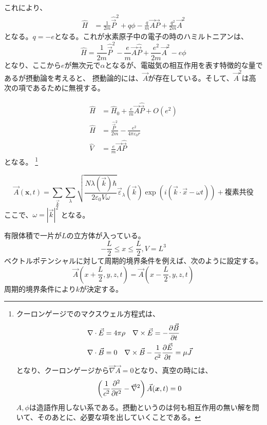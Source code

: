 \documentclass[titlepage]{ltjsarticle}
\begin{document}
これにより、
\begin{align}
  \hat{H} & = \frac{1}{2m} {\hat{\vec{P}}}^2 + q \phi - \frac{q}{m}\vec{A}\vec{P} + \frac{q^2}{2m}\vec{A}^2
\end{align}
となる。\(q=-e\)となる。これが水素原子中の電子の時のハミルトニアンは、
\begin{equation}
  \hat{H} = \frac{1}{2m} \hat{\vec{P}}^2 - \frac{e}{m} \vec{A} \hat{\vec{P}} + \frac{e^2}{2m} \vec{A}^2 - e \phi
\end{equation}
となり、ここから\(e\)が無次元で\(\alpha\)となるが、電磁気の相互作用を表す特徴的な量であるが摂動論を考えると、
摂動論的には、\(\vec{A}\)が存在している。そして、\(\vec{A}^2\)は高次の項であるために無視する。

\begin{align}
  \hat{H} & = \hat{H}_0 + \frac{e}{m}\vec{A}\hat{\vec{P}}+ O(e^2)\\
  \hat{H} & = \frac{\hat{\vec{P}}^2}{2m} - \frac{e^2}{4\pi \varepsilon_0 r}\\
  \hat{V} & = \frac{e}{m}\vec{A}\hat{\vec{P}}
\end{align}
となる。
\footnote{
  クーロンゲージでのマクスウェル方程式は、
  \begin{align}
    \nabla \cdot \vec{E} & = 4\pi \rho \quad \nabla \times \vec{E} = -\pdv{\vec{B}}{t}\\
    \nabla \cdot \vec{B} & = 0 \quad \nabla \times \vec{B} -\frac{1}{c^2} \pdv{\vec{E}}{t} = \mu \vec{J}
  \end{align}
  となり、クーロンゲージから\(\vec{\nabla}\vec{A} = 0\)となり、真空の時には、
  \begin{equation}
    \left( \frac{1}{c^2} \pdv[order=2]{}{t} - \vec{\nabla}^2 \right)\vec{A}(\bm{x},t) = 0
  \end{equation}
  \(A,\phi\)は造語作用しない系である。摂動というのは何も相互作用の無い解を問いて、そのあとに、必要な項を出していくことである。
}

\begin{equation}
  \vec{A}(\bm{x},t) = \sum_{\vec{k}}\sum_\lambda \sqrt{\frac{N \lambda(\vec{k})\hbar}{2 \varepsilon_0 V \omega}} \vec{\varepsilon}_\lambda(\vec{k}) \exp\left( i \left( \vec{k} \cdot \vec{x} - \omega t  \right) \right) + \text{複素共役}
\end{equation}
ここで、\(\omega= |\vec{k}|^2\)
となる。

有限体積で一片が\(L\)の立方体が入っている。
\begin{equation}
  - \frac{L}{2} \le x \le \frac{L}{2} , V = L^3 
\end{equation}
ベクトルポテンシャルに対して周期的境界条件を例えば、次のように設定する。
\begin{equation}
  \vec{A}(x+\frac{L}{2},y,z,t) = \vec{A}(x-\frac{L}{2},y,z,t)
\end{equation}
周期的境界条件により\(k\)が決定する。
\end{document}
